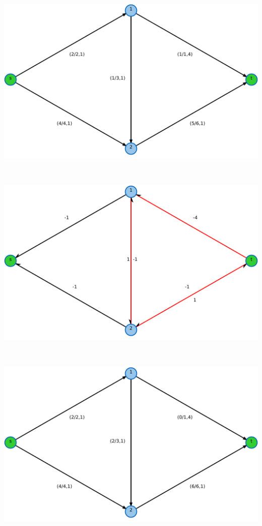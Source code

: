 \pagebreak
\begin{center}
\begin{minipage}[t]{0.60\textwidth}
    \includegraphics[width=\textwidth]{img/cycle-canceling-1.pdf}
\end{minipage}
\\
\begin{minipage}[t]{0.60\textwidth}
    \includegraphics[width=\textwidth]{img/cycle-canceling-2.pdf}
\end{minipage}
\\
\begin{minipage}[t]{0.60\textwidth}
    \includegraphics[width=\textwidth]{img/cycle-canceling-3.pdf}
\end{minipage}
\end{center}
